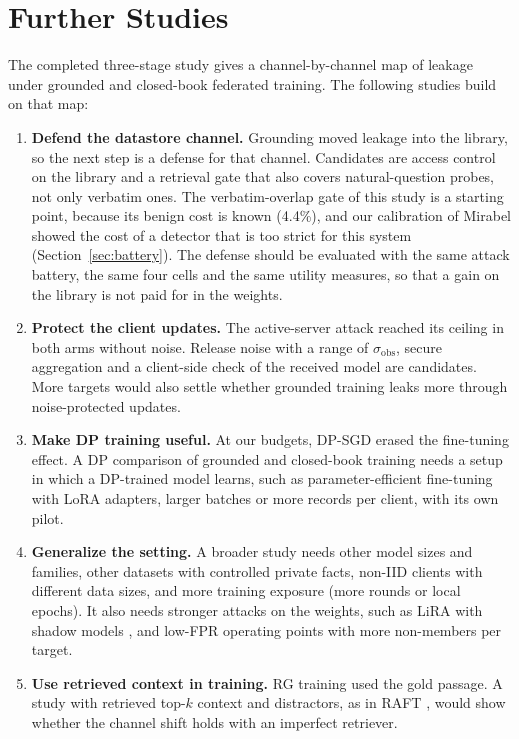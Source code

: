 \documentclass[11pt]{article}
\begin{document}
\section{Further Studies}\label{sec:further}

The completed three-stage study gives a channel-by-channel map of leakage under grounded and closed-book federated training. The following studies build on that map:
\begin{enumerate}
  \item \textbf{Defend the datastore channel.} Grounding moved leakage into the library, so the next step is a defense for that channel. Candidates are access control on the library and a retrieval gate that also covers natural-question probes, not only verbatim ones. The verbatim-overlap gate of this study is a starting point, because its benign cost is known (4.4\%), and our calibration of Mirabel \citep{choi2025mirabel} showed the cost of a detector that is too strict for this system (Section~\ref{sec:battery}). The defense should be evaluated with the same attack battery, the same four cells and the same utility measures, so that a gain on the library is not paid for in the weights.
  \item \textbf{Protect the client updates.} The active-server attack reached its ceiling in both arms without noise. Release noise with a range of $\sigma_{\mathrm{obs}}$, secure aggregation and a client-side check of the received model are candidates. More targets would also settle whether grounded training leaks more through noise-protected updates.
  \item \textbf{Make DP training useful.} At our budgets, DP-SGD erased the fine-tuning effect. A DP comparison of grounded and closed-book training needs a setup in which a DP-trained model learns, such as parameter-efficient fine-tuning with LoRA adapters, larger batches or more records per client, with its own pilot.
  \item \textbf{Generalize the setting.} A broader study needs other model sizes and families, other datasets with controlled private facts, non-IID clients with different data sizes, and more training exposure (more rounds or local epochs). It also needs stronger attacks on the weights, such as LiRA with shadow models \citep{carlini2022first}, and low-FPR operating points with more non-members per target.
  \item \textbf{Use retrieved context in training.} RG training used the gold passage. A study with retrieved top-$k$ context and distractors, as in RAFT \citep{zhang2024raft}, would show whether the channel shift holds with an imperfect retriever.

\end{enumerate}
\end{document}
